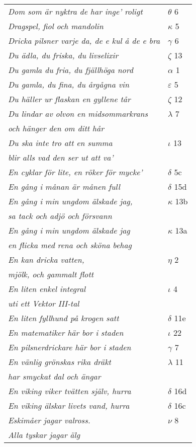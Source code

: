 \documentclass[a6paper,10pt]{article}
\begin{document}
\newpage
\setlength{\oddsidemargin}{-0.67in}
\begin{table}[!h]
\begin{tabular}{l l}
\textit{Dom som är nyktra de har inge' roligt}	&$\theta$ 6\\
\textit{Dragspel, fiol och mandolin}	&$\kappa$ 5\\
\textit{Dricka pilsner varje da, de e kul å de e bra}	&$\gamma$ 6\\
\textit{Du ädla, du friska, du livselixir}	&$\zeta$ 13\\
\textit{Du gamla du fria, du fjällhöga nord}	&$\alpha$ 1\\
\textit{Du gamla, du fina, du årgågna vin}	&$\varepsilon$ 5\\
\textit{Du häller ur flaskan en gyllene tår}	&$\zeta$ 12\\
\textit{Du lindar av olvon en midsommarkrans}	&$\lambda$ 7\\
\textit{och hänger den om ditt hår} &\\
\textit{Du ska inte tro att en summa}	&$\iota$ 13\\
\textit{blir alls vad den ser ut att va'} &\\
\textit{En cyklar för lite, en röker för mycke'}	&$\delta$ 5c\\
\textit{En gång i månan är månen full}	&$\delta$ 15d\\
\textit{En gång i min ungdom älskade jag,}	&$\kappa$ 13b\\
\textit{sa tack och adjö och försvann} &\\
\textit{En gång i min ungdom älskade jag}	&$\kappa$ 13a\\
\textit{en flicka med rena och sköna behag} &\\
\textit{En kan dricka vatten,}	&$\eta$ 2\\
\textit{mjölk, och gammalt flott} &\\
\textit{En liten enkel integral}	&$\iota$ 4\\
\textit{uti ett Vektor III-tal} &\\
\textit{En liten fyllhund på krogen satt}	&$\delta$ 11e\\
\textit{En matematiker här bor i staden} &$\iota$ 22\\
\textit{En pilsnerdrickare här bor i staden}	&$\gamma$ 7\\
\textit{En vänlig grönskas rika dräkt}	&$\lambda$ 11\\
\textit{har smyckat dal och ängar} &\\
\textit{En viking viker tvätten själv, hurra} &$\delta$ 16d\\
\textit{En viking älskar livets vand, hurra}	&$\delta$ 16c\\
\textit{Eskimåer jagar valross.}	&$\nu$ 8\\
\textit{Alla tyskar jagar älg} &\\
\end{tabular}
\end{table}
\end{document}
